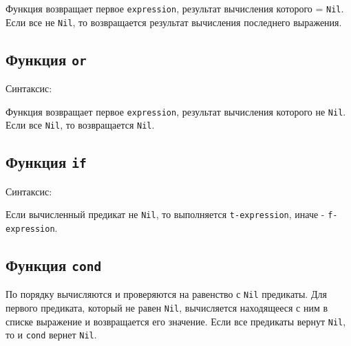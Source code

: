 Функция возвращает первое \texttt{expression}, результат вычисления которого = \texttt{Nil}. Если все не \texttt{Nil}, то возвращается результат вычисления последнего выражения.

\subsection*{Функция \texttt{or}}

Синтаксис: 

Функция возвращает первое \texttt{expression}, результат вычисления которого не \texttt{Nil}. Если все \texttt{Nil}, то возвращается \texttt{Nil}.

\subsection*{Функция \texttt{if}}

Синтаксис: 

Если вычисленный предикат не \texttt{Nil}, то выполняется \texttt{t-expression}, иначе - \texttt{f-expression}.

\subsection*{Функция \texttt{cond}}

По порядку вычисляются и проверяются на равенство с \texttt{Nil} предикаты. Для первого предиката, который не равен \texttt{Nil}, вычисляется находящееся с ним в списке выражение и возвращается его значение. Если все предикаты вернут \texttt{Nil}, то и \texttt{cond} вернет \texttt{Nil}.